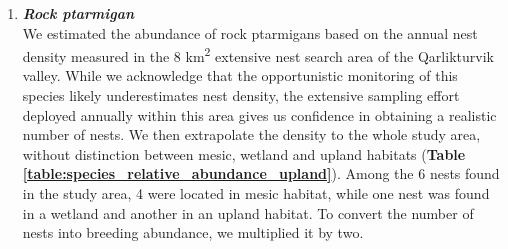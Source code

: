 \documentclass[a4paper,twoside,12pt]{article}
\begin{document}
\begin{enumerate}[label=\alph*.]
        	\item[] \textit{\textbf{Rock ptarmigan}}\\
        	We estimated the abundance of rock ptarmigans based on the annual nest density measured in the 8 km\textsuperscript{2} extensive nest search area of the Qarlikturvik valley. While we acknowledge that the opportunistic monitoring of this species likely underestimates nest density, the extensive sampling effort deployed annually within this area gives us confidence in obtaining a realistic number of nests. We then extrapolate the density to the whole study area, without distinction between mesic, wetland and upland habitats (\textbf{Table \ref{table:species_relative_abundance_upland}}). Among the 6 nests found in the study area, 4 were located in mesic habitat, while one nest was found in a wetland and another in an upland habitat. To convert the number of nests into breeding abundance, we multiplied it by two.
        	

\end{enumerate}
\end{document}
